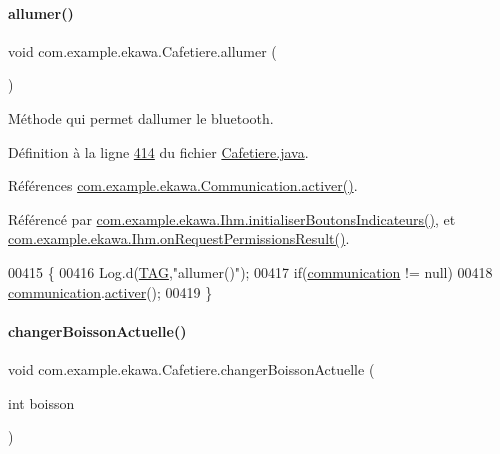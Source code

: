 \paragraph{\texorpdfstring{allumer()}{allumer()}}
{\footnotesize\ttfamily void com.\+example.\+ekawa.\+Cafetiere.\+allumer (\begin{DoxyParamCaption}{ }\end{DoxyParamCaption})}



Méthode qui permet d\textquotesingle{}allumer le bluetooth. 



Définition à la ligne \hyperlink{_cafetiere_8java_source_l00414}{414} du fichier \hyperlink{_cafetiere_8java_source}{Cafetiere.\+java}.



Références \hyperlink{_communication_8java_source_l00215}{com.\+example.\+ekawa.\+Communication.\+activer()}.



Référencé par \hyperlink{_ihm_8java_source_l00357}{com.\+example.\+ekawa.\+Ihm.\+initialiser\+Boutons\+Indicateurs()}, et \hyperlink{_ihm_8java_source_l00338}{com.\+example.\+ekawa.\+Ihm.\+on\+Request\+Permissions\+Result()}.


\begin{DoxyCode}
00415     \{
00416         Log.d(\hyperlink{classcom_1_1example_1_1ekawa_1_1_cafetiere_aa0c1fd99a2508b06c462aea17034aa91}{TAG},\textcolor{stringliteral}{"allumer()"});
00417         \textcolor{keywordflow}{if}(\hyperlink{classcom_1_1example_1_1ekawa_1_1_cafetiere_af9506a7805d000d2cb83444cdb8ea889}{communication} != null)
00418             \hyperlink{classcom_1_1example_1_1ekawa_1_1_cafetiere_af9506a7805d000d2cb83444cdb8ea889}{communication}.\hyperlink{classcom_1_1example_1_1ekawa_1_1_communication_a64e0731414722f27a990d8ac884aca83}{activer}();
00419     \}
\end{DoxyCode}
\mbox{\label{classcom_1_1example_1_1ekawa_1_1_cafetiere_a50775b093a7f6d1b0fe8ad3662d80fc5}} 
\paragraph{\texorpdfstring{changer\+Boisson\+Actuelle()}{changerBoissonActuelle()}}
{\footnotesize\ttfamily void com.\+example.\+ekawa.\+Cafetiere.\+changer\+Boisson\+Actuelle (\begin{DoxyParamCaption}\item[{int}]{boisson }\end{DoxyParamCaption})}




